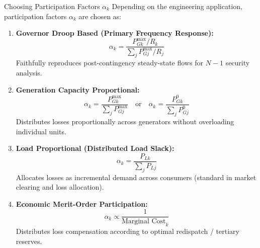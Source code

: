 \begin{frame}[allowframebreaks]{Choosing Participation Factors $\alpha_k$}
    Depending on the engineering application, participation factors $\alpha_k$ are chosen as:
    
    \begin{enumerate}
        \item \textbf{Governor Droop Based (Primary Frequency Response):}
        $$\alpha_k = \frac{P_{Gk}^{\max} / R_k}{\sum_{j} P_{Gj}^{\max} / R_j}$$
        Faithfully reproduces post-contingency steady-state flows for $N-1$ security analysis.
        \vspace{0.15cm}
        \item \textbf{Generation Capacity Proportional:}
        $$\alpha_k = \frac{P_{Gk}^{\max}}{\sum_j P_{Gj}^{\max}} \quad \text{or} \quad \alpha_k = \frac{P_{Gk}^0}{\sum_j P_{Gj}^0}$$
        Distributes losses proportionally across generators without overloading individual units.
        \item \textbf{Load Proportional (Distributed Load Slack):}
        $$\alpha_k = \frac{P_{Lk}}{\sum_j P_{Lj}}$$
        Allocates losses as incremental demand across consumers (standard in market clearing and loss allocation).
        \vspace{0.2cm}
        \item \textbf{Economic Merit-Order Participation:}
        $$\alpha_k \propto \frac{1}{\text{Marginal Cost}_k}$$
        Distributes loss compensation according to optimal redispatch / tertiary reserves.
    \end{enumerate}
\end{frame}


